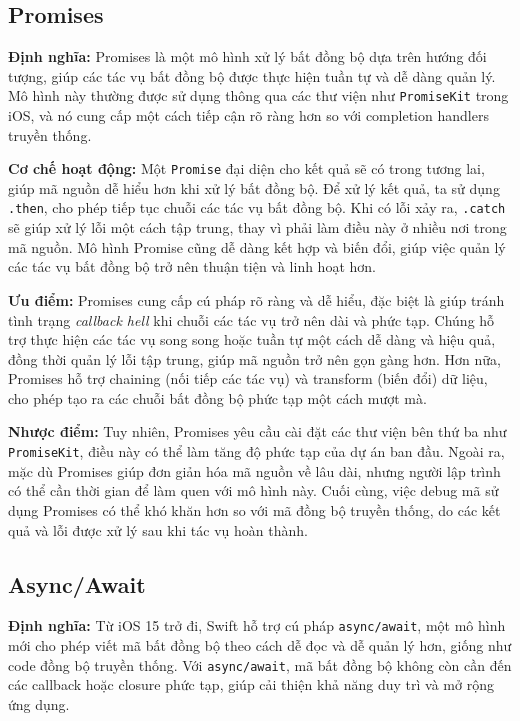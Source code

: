 \vspace{0.5em}

\subsection{Promises}
\textbf{Định nghĩa:} Promises là một mô hình xử lý bất đồng bộ dựa trên hướng đối tượng, giúp các tác vụ bất đồng bộ được thực hiện tuần tự và dễ dàng quản lý. Mô hình này thường được sử dụng thông qua các thư viện như \texttt{PromiseKit} trong iOS, và nó cung cấp một cách tiếp cận rõ ràng hơn so với completion handlers truyền thống.

\vspace{0.5em}

\textbf{Cơ chế hoạt động:} Một \texttt{Promise} đại diện cho kết quả sẽ có trong tương lai, giúp mã nguồn dễ hiểu hơn khi xử lý bất đồng bộ. Để xử lý kết quả, ta sử dụng \texttt{.then}, cho phép tiếp tục chuỗi các tác vụ bất đồng bộ. Khi có lỗi xảy ra, \texttt{.catch} sẽ giúp xử lý lỗi một cách tập trung, thay vì phải làm điều này ở nhiều nơi trong mã nguồn. Mô hình Promise cũng dễ dàng kết hợp và biến đổi, giúp việc quản lý các tác vụ bất đồng bộ trở nên thuận tiện và linh hoạt hơn.

\vspace{0.5em}

\textbf{Ưu điểm:} Promises cung cấp cú pháp rõ ràng và dễ hiểu, đặc biệt là giúp tránh tình trạng \textit{callback hell} khi chuỗi các tác vụ trở nên dài và phức tạp. Chúng hỗ trợ thực hiện các tác vụ song song hoặc tuần tự một cách dễ dàng và hiệu quả, đồng thời quản lý lỗi tập trung, giúp mã nguồn trở nên gọn gàng hơn. Hơn nữa, Promises hỗ trợ chaining (nối tiếp các tác vụ) và transform (biến đổi) dữ liệu, cho phép tạo ra các chuỗi bất đồng bộ phức tạp một cách mượt mà.

\vspace{0.5em}

\textbf{Nhược điểm:} Tuy nhiên, Promises yêu cầu cài đặt các thư viện bên thứ ba như \texttt{PromiseKit}, điều này có thể làm tăng độ phức tạp của dự án ban đầu. Ngoài ra, mặc dù Promises giúp đơn giản hóa mã nguồn về lâu dài, nhưng người lập trình có thể cần thời gian để làm quen với mô hình này. Cuối cùng, việc debug mã sử dụng Promises có thể khó khăn hơn so với mã đồng bộ truyền thống, do các kết quả và lỗi được xử lý sau khi tác vụ hoàn thành.
\subsection{Async/Await}
\textbf{Định nghĩa:} Từ iOS 15 trở đi, Swift hỗ trợ cú pháp \texttt{async/await}, một mô hình mới cho phép viết mã bất đồng bộ theo cách dễ đọc và dễ quản lý hơn, giống như code đồng bộ truyền thống. Với \texttt{async/await}, mã bất đồng bộ không còn cần đến các callback hoặc closure phức tạp, giúp cải thiện khả năng duy trì và mở rộng ứng dụng.

